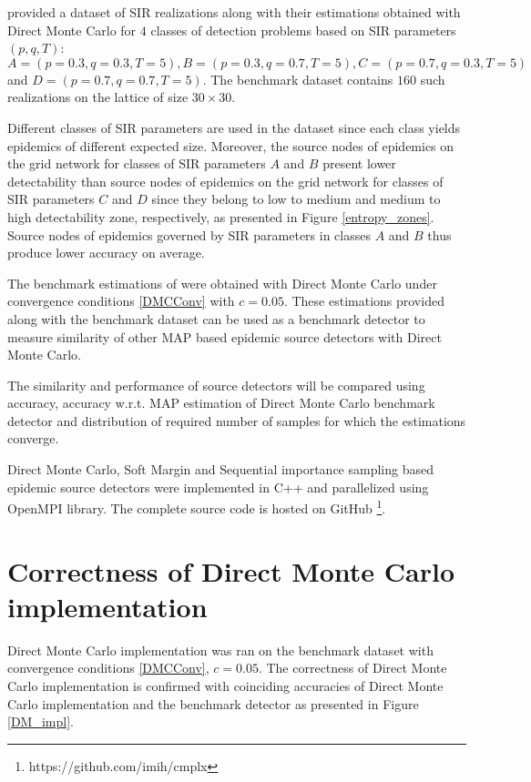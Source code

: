 \documentclass[times, utf8, diplomski]{fer}
\begin{document}
\citet{Nino} provided a dataset of SIR realizations along with their estimations obtained with Direct Monte Carlo for $4$ classes of detection problems based on SIR parameters $(p, q, T)$: $A = (p=0.3, q=0.3, T=5), B = (p=0.3, q=0.7, T=5), C = (p=0.7, q=0.3, T=5)$ and  $D = (p=0.7, q=0.7, T=5)$. The benchmark dataset contains $160$ such realizations on the lattice of size $30 \times 30$. 


  Different classes of SIR parameters are used in the dataset since each class yields epidemics of different expected size. Moreover, the source nodes of epidemics on the grid network for classes of SIR parameters $A$ and $B$  present lower detectability than source nodes of epidemics on the grid network for classes of SIR parameters $C$ and $D$ since they belong to low to medium and medium to high detectability zone, respectively, as presented in Figure \ref{entropy_zones}. Source nodes of epidemics governed by SIR parameters in classes $A$ and $B$ thus produce lower accuracy on average.

 The benchmark estimations of \citet{Nino} were obtained with Direct Monte Carlo   under convergence conditions \ref{DMCConv} with $c = 0.05$.
 These estimations provided  along with the benchmark dataset can be used as a benchmark detector to measure similarity of other  MAP based epidemic source detectors with Direct Monte Carlo. 
 
 The similarity and performance of source detectors will be compared using accuracy, accuracy w.r.t. MAP estimation of Direct Monte Carlo benchmark detector and distribution of required number of samples for which the estimations converge. 
 
Direct Monte Carlo, Soft Margin and Sequential importance sampling based epidemic source detectors were implemented in C++ and parallelized using  OpenMPI \cite{open_mpi} library. The complete source code is hosted on GitHub \footnote{https://github.com/imih/cmplx}.


\section{Correctness of  Direct Monte Carlo implementation}

 Direct Monte Carlo implementation was ran on the benchmark dataset with convergence conditions \ref{DMCConv}, $c = 0.05$. 
The correctness of Direct Monte Carlo implementation is confirmed with coinciding accuracies of Direct Monte Carlo implementation and the benchmark detector as presented in Figure \ref{DM_impl}.
\end{document}
